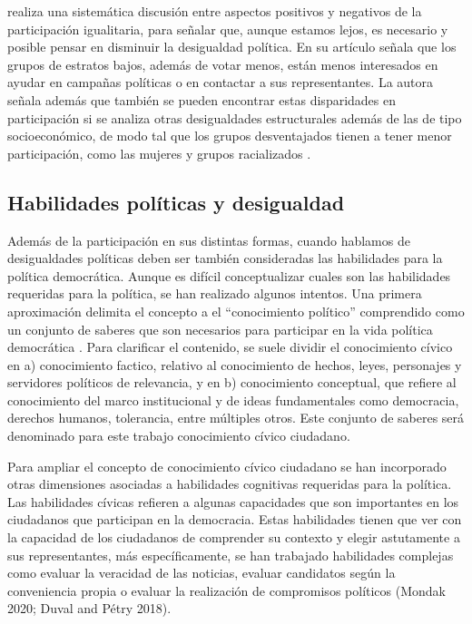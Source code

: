 \documentclass[12pt,twoside]{templates/facsothesis}
\begin{document}
\citet{verba_Would_2003} realiza una sistemática discusión entre aspectos positivos y negativos de la participación igualitaria, para señalar que, aunque estamos lejos, es necesario y posible pensar en disminuir la desigualdad política. En su artículo \citet{verba_Would_2003} señala que los grupos de estratos bajos, además de votar menos, están menos interesados en ayudar en campañas políticas o en contactar a sus representantes. La autora señala además que también se pueden encontrar estas disparidades en participación si se analiza otras desigualdades estructurales además de las de tipo socioeconómico, de modo tal que los grupos desventajados tienen a tener menor participación, como las mujeres y grupos racializados \citep{desposato_Gender_2009, coffe_Explaining_2020, hutchings_CENTRALITY_2004}.

\hypertarget{habilidades-poluxedticas-y-desigualdad}{%
\subsection{Habilidades políticas y desigualdad}\label{habilidades-poluxedticas-y-desigualdad}}

Además de la participación en sus distintas formas, cuando hablamos de desigualdades políticas deben ser también consideradas las habilidades para la política democrática. Aunque es difícil conceptualizar cuales son las habilidades requeridas para la política, se han realizado algunos intentos. Una primera aproximación delimita el concepto a el ``conocimiento político'' comprendido como un conjunto de saberes que son necesarios para participar en la vida política democrática \citep[ ]{petricevic_Why_2020}. Para clarificar el contenido, se suele dividir el conocimiento cívico en a) conocimiento factico, relativo al conocimiento de hechos, leyes, personajes y servidores políticos de relevancia, y en b) conocimiento conceptual, que refiere al conocimiento del marco institucional y de ideas fundamentales como democracia, derechos humanos, tolerancia, entre múltiples otros. Este conjunto de saberes será denominado para este trabajo conocimiento cívico ciudadano.

Para ampliar el concepto de conocimiento cívico ciudadano se han incorporado otras dimensiones asociadas a habilidades cognitivas requeridas para la política. Las habilidades cívicas refieren a algunas capacidades que son importantes en los ciudadanos que participan en la democracia. Estas habilidades tienen que ver con la capacidad de los ciudadanos de comprender su contexto y elegir astutamente a sus representantes, más específicamente, se han trabajado habilidades complejas como evaluar la veracidad de las noticias, evaluar candidatos según la conveniencia propia o evaluar la realización de compromisos políticos (Mondak 2020; Duval and Pétry 2018).
\end{document}
